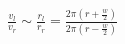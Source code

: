 \documentclass[preview]{standalone}
\begin{document}
\begin{center}
$\frac{v_{l} } {v_{r} }\sim \frac{r_{l}}{ {r_{r} } } = \frac{2\pi(r+\frac{w}{2})}{2\pi(r-\frac{w}{2})}$
\end{center}
\end{document}
